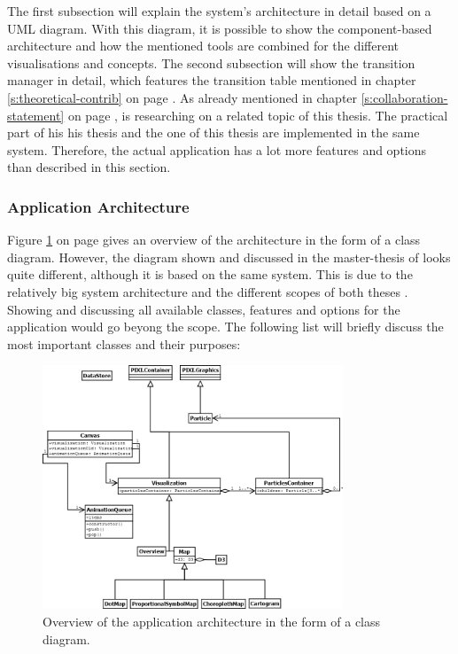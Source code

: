 The first subsection will explain the system's architecture in detail based on a \ac{UML} diagram. With this diagram, it is possible to show the component-based architecture and how the mentioned tools are combined for the different visualisations and concepts. The second subsection will show the transition manager in detail, which features the transition table mentioned in chapter \ref{s:theoretical-contrib} on page \pageref{s:theoretical-contrib}.
As already mentioned in chapter \ref{s:collaboration-statement} on page \pageref{s:collaboration-statement}, \citeauthor{Wanko2016} is researching on a related topic of this thesis. The practical part of his his thesis and the one of this thesis are implemented in the same system. Therefore, the actual application has a lot more features and options than described in this section.

\subsubsection{Application Architecture}
Figure \ref{fig:uml-practical-approach} on page \pageref{fig:uml-practical-approach} gives an overview of the architecture in the form of a class diagram. However, the diagram shown and discussed in the master-thesis of \citeauthor{Wanko2016} looks quite different, although it is based on the same system. This is due to the relatively big system architecture and the different scopes of both theses . Showing and discussing all available classes, features and options for the application would go beyong the scope. The following list will briefly discuss the most important classes and their purposes:

\begin{figure}[!htb]
\centering
\includegraphics[width=0.8\textwidth,keepaspectratio]{images/results/dia2.png}
\caption[
    Overview of the application architecture in the form of a class diagram.
]{Overview of the application architecture in the form of a class diagram.}
\label{fig:uml-practical-approach}
\end{figure}


